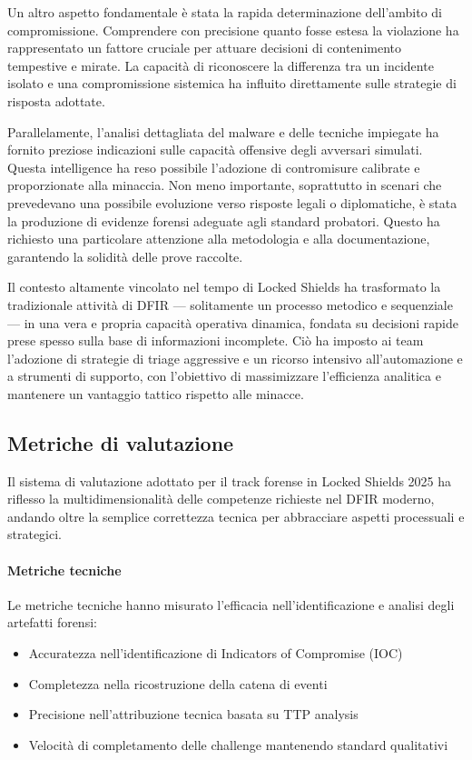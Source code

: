 Un altro aspetto fondamentale è stata la rapida determinazione dell’ambito di compromissione. Comprendere con precisione quanto fosse estesa la violazione ha rappresentato un fattore cruciale per attuare decisioni di contenimento tempestive e mirate. La capacità di riconoscere la differenza tra un incidente isolato e una compromissione sistemica ha influito direttamente sulle strategie di risposta adottate.

Parallelamente, l’analisi dettagliata del malware e delle tecniche impiegate ha fornito preziose indicazioni sulle capacità offensive degli avversari simulati. Questa intelligence ha reso possibile l’adozione di contromisure calibrate e proporzionate alla minaccia. Non meno importante, soprattutto in scenari che prevedevano una possibile evoluzione verso risposte legali o diplomatiche, è stata la produzione di evidenze forensi adeguate agli standard probatori. Questo ha richiesto una particolare attenzione alla metodologia e alla documentazione, garantendo la solidità delle prove raccolte.

Il contesto altamente vincolato nel tempo di Locked Shields ha trasformato la tradizionale attività di DFIR — solitamente un processo metodico e sequenziale — in una vera e propria capacità operativa dinamica, fondata su decisioni rapide prese spesso sulla base di informazioni incomplete. Ciò ha imposto ai team l’adozione di strategie di triage aggressive e un ricorso intensivo all'automazione e a strumenti di supporto, con l’obiettivo di massimizzare l’efficienza analitica e mantenere un vantaggio tattico rispetto alle minacce.

\subsection{Metriche di valutazione}

Il sistema di valutazione adottato per il track forense in Locked Shields 2025 ha riflesso la multidimensionalità delle competenze richieste nel DFIR moderno, andando oltre la semplice correttezza tecnica per abbracciare aspetti processuali e strategici.

\paragraph{Metriche tecniche}
Le metriche tecniche hanno misurato l'efficacia nell'identificazione e analisi degli artefatti forensi:
\begin{itemize}
    \item Accuratezza nell'identificazione di Indicators of Compromise (IOC)
    \item Completezza nella ricostruzione della catena di eventi
    \item Precisione nell'attribuzione tecnica basata su TTP analysis
    \item Velocità di completamento delle challenge mantenendo standard qualitativi
\end{itemize}

